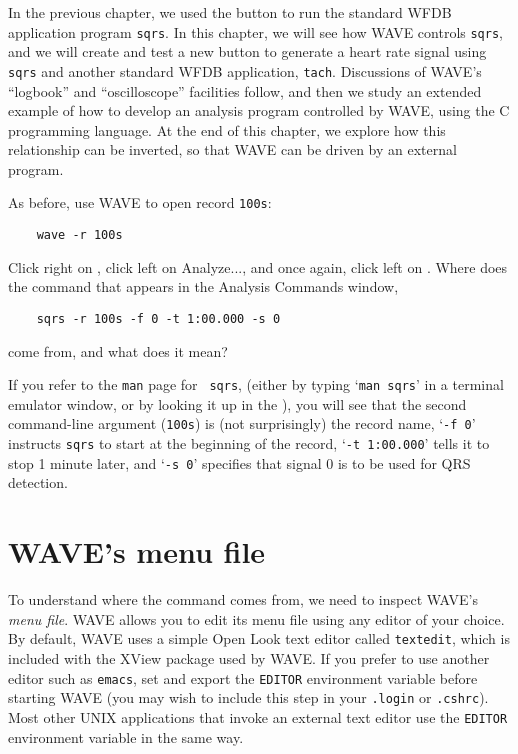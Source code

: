 \documentclass[twoside]{book}
\newcommand{\button}[1]{\cornersize{2}\ovalbox{\rule[-.3mm]{0cm}{2.5mm}\small\sf ~#1~}}
\newcommand{\menubutton}[1]{\button{#1~\ensuremath{\nabla}}}
\newcommand{\WAVE}{{\sf WAVE}\xspace}
\begin{document}
In the previous chapter, we used the \button{Mark QRS complexes}
button to run the standard WFDB application program {\tt sqrs}.  In this
chapter, we will see how \WAVE{} controls {\tt sqrs}, and we will create
and test a new button to generate a heart rate signal using {\tt sqrs}
and another standard WFDB application, {\tt tach}.  Discussions of
\WAVE{}'s ``logbook'' and ``oscilloscope'' facilities follow, and then
we study an extended example of how to develop an analysis program
controlled by \WAVE{}, using the C programming language.  At the end of
this chapter, we explore how this relationship can be inverted, so
that \WAVE{} can be driven by an external program.

As before, use \WAVE{} to open record {\tt 100s}:
\begin{verbatim}
    wave -r 100s
\end{verbatim}
Click right on \menubutton{File}, click left on
{\sf Analyze...}, and once again, click left on \button{Mark QRS complexes}.
Where does the command that appears in the {\sf Analysis Commands} window,
\begin{verbatim}
    sqrs -r 100s -f 0 -t 1:00.000 -s 0
\end{verbatim}
come from, and what does it mean?

If you refer to the {\tt man} page for {\tt
sqrs},
(either by typing `{\tt man sqrs}' in a terminal emulator window, or by
looking it up in the
),
you will see that
the second command-line argument ({\tt 100s}) is (not surprisingly) the record
name, `{\tt -f 0}' instructs {\tt sqrs} to start at the beginning of the
record, `{\tt -t 1:00.000}' tells it to stop 1 minute later, and `{\tt -s 0}'
specifies that signal 0 is to be used for QRS detection.

\section{\WAVE{}'s menu file}

\label{sec:menu-file}
To understand where the command comes from, we need to inspect \WAVE{}'s
\emph{menu file}.
\WAVE{} allows you to edit its menu file using any editor of your
choice.  By default, \WAVE{} uses a simple Open Look text editor
called {\tt textedit}, which is included with the XView package used
by \WAVE{}.  If you prefer to use another editor such as {\tt emacs},
set and export the {\tt EDITOR} environment variable before starting
\WAVE{} (you may wish to include this step in your {\tt .login} or
{\tt .cshrc}).  Most other UNIX applications that invoke an external
text editor use the {\tt EDITOR} environment variable in the same way.
\end{document}
